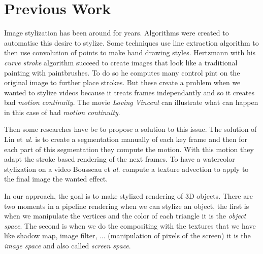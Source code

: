 \chapter{Previous Work}

Image stylization has been around for years. Algorithms were created to automatise this desire to stylize. Some techniques use line extraction algorithm to then use convolution of points to make hand drawing styles. Hertzmann with his \textit{curve stroke} algorithm \cite{rosin_stroke_2013}  succeed to create images that look like a traditional painting with paintbrushes. To do so he computes many control pint on the original image to further place strokes. But these create a problem when we wanted to stylize videos because it treats frames independantly and so it creates bad \textit{motion continuity}. The movie \textit{Loving Vincent}\cite{LovingVincent} can illustrate what can happen in this case of bad \textit{motion continuity}.

Then some researches have be to propose a solution to this issue\cite{litwinowicz_processing_1997, hays_image_2004, bousseau_video_2007, lin_video_nodate}. The solution of Lin et \textit{al.} \cite{lin_video_nodate} is to create a segmentation manually of each key frame and then for each part of this segmentation they compute the motion. With this motion they adapt the stroke based rendering of the next frames. To have a watercolor stylization on a video Bousseau et \textit{al.} compute a texture advection to apply to the final image the wanted effect.

In our approach, the goal is to make stylized rendering of 3D objects. There are two moments in a pipeline rendering when we can stylize an object, the first is when we manipulate the vertices and the color of each triangle it is the \textit{object space}. The second is when we do the compositing with the textures that we have like shadow map, image filter, ... (manipulation of pixels of the screen) it is the \textit{image space} and also called \textit{screen space}.
